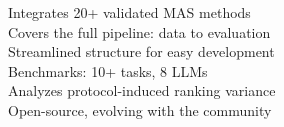 \documentclass[preview]{standalone}
\begin{document}
Integrates 20+ validated MAS methods\\Covers the full pipeline: data to evaluation\\Streamlined structure for easy development\\Benchmarks: 10+ tasks, 8 LLMs\\Analyzes protocol-induced ranking variance\\Open-source, evolving with the community\\
\end{document}
